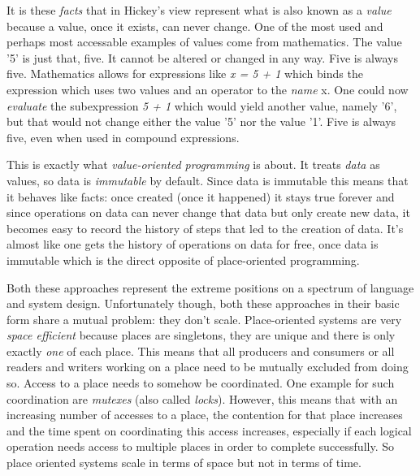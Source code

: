 It is these \textit{facts} that in Hickey's view represent what is also
known as a \textit{value} because a value, once it exists, can never
change. One of the most used and perhaps most accessable examples of
values come from mathematics. The value '5' is just that, five. It
cannot be altered or changed in any way. Five is always five.
Mathematics allows for expressions like \textit{x = 5 + 1} which
binds the expression which uses two values and an operator to
the \textit{name} x. One could now \textit{evaluate} the subexpression
\textit{5 + 1} which would yield another value, namely '6', but that
would not change either the value '5' nor the value '1'. Five is always
five, even when used in compound expressions.

This is exactly what \textit{value-oriented programming} is about.
It treats \textit{data} as values, so data is \textit{immutable}
by default. Since data is immutable this means that it behaves
like facts: once created (once it happened) it stays true forever
and since operations on data can never change that data but only
create new data, it becomes easy to record the history of steps
that led to the creation of data. It's almost like one gets the
history of operations on data for free, once data is immutable
which is the direct opposite of place-oriented programming.
\newline

Both these approaches represent the extreme positions on a spectrum
of language and system design. Unfortunately though, both these
approaches in their basic form share a mutual problem: they don't scale.
Place-oriented systems are very \textit{space efficient} because
places are singletons, they are unique and there is only exactly
\textit{one} of each place. This means that all producers and
consumers or all readers and writers working on a place need to
be mutually excluded from doing so. Access to a place needs to
somehow be coordinated. One example for such coordination are
\textit{mutexes} (also called \textit{locks}). However, this means
that with an increasing number of accesses to a place, the
contention for that place increases and the time spent on coordinating
this access increases, especially if each logical operation needs
access to multiple places in order to complete successfully. So
place oriented systems scale in terms of space but not in terms of
time.

